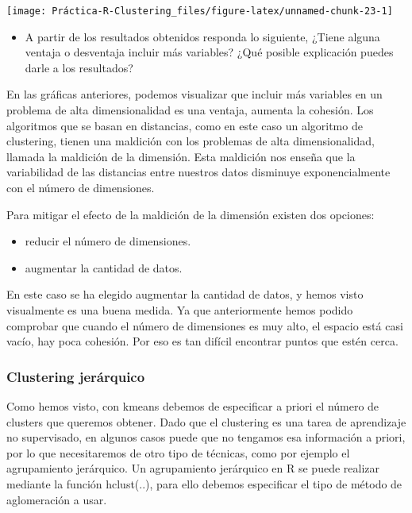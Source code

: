 \documentclass[]{article}
\providecommand{\tightlist}{%
  \setlength{\itemsep}{0pt}\setlength{\parskip}{0pt}}
\begin{document}
\begin{center}\texttt{[image: Práctica-R-Clustering\_files/figure-latex/unnamed-chunk-23-1]} \end{center}

\begin{itemize}
\tightlist
\item
  A partir de los resultados obtenidos responda lo siguiente, ¿Tiene
  alguna ventaja o desventaja incluir más variables? ¿Qué posible
  explicación puedes darle a los resultados?
\end{itemize}

En las gráficas anteriores, podemos visualizar que incluir más variables
en un problema de alta dimensionalidad es una ventaja, aumenta la
cohesión. Los algoritmos que se basan en distancias, como en este caso
un algoritmo de clustering, tienen una maldición con los problemas de
alta dimensionalidad, llamada la maldición de la dimensión. Esta
maldición nos enseña que la variabilidad de las distancias entre
nuestros datos disminuye exponencialmente con el número de dimensiones.

Para mitigar el efecto de la maldición de la dimensión existen dos
opciones:

\begin{itemize}
\tightlist
\item
  reducir el número de dimensiones.
\item
  augmentar la cantidad de datos.
\end{itemize}

En este caso se ha elegido augmentar la cantidad de datos, y hemos visto
visualmente es una buena medida. Ya que anteriormente hemos podido
comprobar que cuando el número de dimensiones es muy alto, el espacio
está casi vacío, hay poca cohesión. Por eso es tan difícil encontrar
puntos que estén cerca.

\hypertarget{clustering-jeruxe1rquico}{%
\subsubsection{Clustering jerárquico}\label{clustering-jeruxe1rquico}}

Como hemos visto, con kmeans debemos de especificar a priori el número
de clusters que queremos obtener. Dado que el clustering es una tarea de
aprendizaje no supervisado, en algunos casos puede que no tengamos esa
información a priori, por lo que necesitaremos de otro tipo de técnicas,
como por ejemplo el agrupamiento jerárquico. Un agrupamiento jerárquico
en R se puede realizar mediante la función hclust(..), para ello debemos
especificar el tipo de método de aglomeración a usar.
\end{document}
